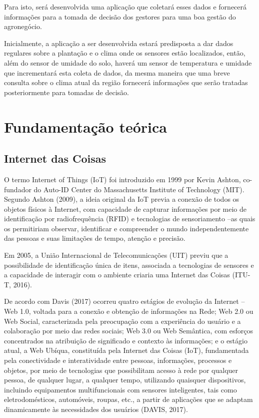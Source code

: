 \documentclass[eso]{bcc}
\begin{document}
Para isto, será desenvolvida uma aplicação que coletará esses dados e fornecerá informações para 
a tomada de decisão dos gestores para uma boa gestão do agronegócio.

Inicialmente, a aplicação a ser desenvolvida estará predisposta a dar dados regulares sobre a 
plantação e o clima onde os sensores estão localizados, então, além do sensor de umidade do solo, 
haverá um sensor de temperatura e umidade que incrementará esta coleta de dados, da mesma maneira 
que uma breve consulta sobre o clima atual da região fornecerá informações que serão tratadas 
posteriormente para tomadas de decisão.

\chapter{Fundamentação teórica}\label{chap:fundamentacao}

\section{Internet das Coisas}
O termo Internet of Things (IoT) foi introduzido em 1999 por Kevin Ashton, 
co-fundador do Auto-ID Center do Massachusetts Institute of Technology (MIT). 
Segundo Ashton (2009), a ideia original da IoT previa a conexão de todos os objetos 
físicos à Internet, com capacidade de capturar informações por meio de identificação 
por radiofrequência (RFID) e tecnologias de sensoriamento –as quais os permitiriam observar, 
identificar e compreender o mundo independentemente das pessoas e suas limitações de tempo, 
atenção e precisão.

Em 2005, a União Internacional de Telecomunicações (UIT) previu que a possibilidade de 
identificação única de itens, associada a tecnologias de sensores e a capacidade de interagir 
com o ambiente criaria uma Internet das Coisas (ITU-T, 2016). 

De acordo com Davis (2017) ocorreu quatro estágios de evolução da Internet – Web 1.0, voltada 
para a conexão e obtenção de informações na Rede; Web 2.0 ou Web Social, caracterizada pela 
preocupação com a experiência do usuário e a colaboração por meio das redes sociais; 
Web 3.0 ou Web Semântica, com esforços concentrados na atribuição de significado e contexto 
às informações; e o estágio atual, a Web Ubíqua, constituída pela Internet das Coisas (IoT), 
fundamentada pela conectividade e interatividade entre pessoas, informações, processos e objetos, 
por meio de tecnologias que possibilitam acesso à rede por qualquer pessoa, de qualquer lugar, 
a qualquer tempo, utilizando quaisquer dispositivos, incluindo equipamentos multifuncionais com 
sensores inteligentes, tais como eletrodomésticos, automóveis, roupas, etc., a partir de 
aplicações que se adaptam dinamicamente às necessidades dos usuários (DAVIS, 2017). 
\end{document}
